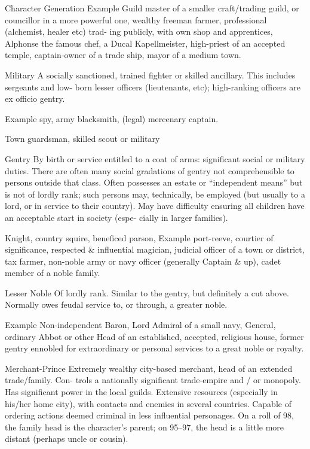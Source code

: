 \begin{Chapter}{Character Generation}
Example 
Guild  master  of  a  smaller  craft/trading 
guild,  or  councillor  in  a  more  powerful  one,  wealthy 
freeman  farmer,  professional  (alchemist,  healer  etc)  trad-
ing publicly, with own shop and apprentices, Alphonse the 
famous  chef,  a  Ducal  Kapellmeister,  high-priest  of  an 
accepted temple, captain-owner of a trade ship, mayor of a 
medium town. 

Military  A  socially  sanctioned,  trained  fighter  or 
skilled  ancillary.  This  includes  sergeants  and  low-
born lesser officers (lieutenants, etc); high-ranking 
officers are ex officio gentry. 

Example 
spy, army blacksmith, (legal) mercenary captain. 

Town  guardsman,  skilled  scout  or  military 

Gentry  By  birth  or  service  entitled  to  a  coat  of 
arms:  significant  social  or  military  duties.  There 
are  often  many  social  gradations  of  gentry  not 
comprehensible to persons outside that class. Often 
possesses  an  estate  or  “independent  means”  but  is 
not  of  lordly  rank;  such  persons  may,  technically, 
be employed (but usually to a lord, or in service to 
their  country).  May  have  difficulty  ensuring  all 
children  have  an  acceptable  start  in  society  (espe-
cially in larger families). 

Knight,  country  squire,  beneficed  parson, 
Example 
port-reeve, courtier of significance, respected \& influential 
magician, judicial officer of a town or district, tax farmer, 
non-noble army or  navy officer (generally  Captain \&  up), 
cadet member of a noble family. 

Lesser Noble Of lordly rank. Similar to the gentry, 
but  definitely  a  cut  above.  Normally  owes  feudal 
service to, or through, a greater noble. 

Example 
Non-independent Baron, Lord Admiral of a 
small  navy,  General,  ordinary  Abbot  or  other  Head  of  an 
established,  accepted,  religious  house,  former  gentry 
ennobled  for  extraordinary  or  personal  services  to  a  great 
noble or royalty. 

Merchant-Prince  Extremely  wealthy  city-based 
merchant,  head  of  an  extended  trade/family.  Con-
trols  a  nationally  significant  trade-empire  and  /  or 
monopoly.  Has  significant  power  in  the  local 
guilds.  Extensive  resources  (especially  in  his/her 
home  city),  with  contacts  and  enemies  in  several 
countries.  Capable  of  ordering  actions  deemed 
criminal in less influential personages. On a roll of 
98,  the  family  head  is  the  character’s  parent;  on 
95–97,  the  head  is  a  little  more  distant  (perhaps 
uncle or cousin). 


\end{Chapter}
